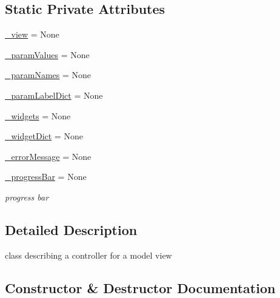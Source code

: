 \subsection*{Static Private Attributes}
\begin{DoxyCompactItemize}
\item 
\hyperlink{class_mu_mo_t_1_1_mu_mo_tcontroller_a27dd8543b5188cdfe40f622d267fe2c5}{\+\_\+view} = None
\item 
\hyperlink{class_mu_mo_t_1_1_mu_mo_tcontroller_a04608181fa27d9aad4983d3694f7ab17}{\+\_\+param\+Values} = None
\item 
\hyperlink{class_mu_mo_t_1_1_mu_mo_tcontroller_ac7734326ac8dbbf9bd0d2c9838633195}{\+\_\+param\+Names} = None
\item 
\hyperlink{class_mu_mo_t_1_1_mu_mo_tcontroller_a13bcda33e0e971cf4ad2710945226add}{\+\_\+param\+Label\+Dict} = None
\item 
\hyperlink{class_mu_mo_t_1_1_mu_mo_tcontroller_a397d0ee37a222317a1bab7deb1270a13}{\+\_\+widgets} = None
\item 
\hyperlink{class_mu_mo_t_1_1_mu_mo_tcontroller_a76e960ae74fc597cd22f7132507eaa20}{\+\_\+widget\+Dict} = None
\item 
\hyperlink{class_mu_mo_t_1_1_mu_mo_tcontroller_afb9cc1f1f0c08393b454f526842425cc}{\+\_\+error\+Message} = None
\item 
\hyperlink{class_mu_mo_t_1_1_mu_mo_tcontroller_a018864aa22d2adb0d3958fb0adbce8e2}{\+\_\+progress\+Bar} = None
\begin{DoxyCompactList}\small\item\em progress bar \end{DoxyCompactList}\end{DoxyCompactItemize}


\subsection{Detailed Description}
class describing a controller for a model view 

\subsection{Constructor \& Destructor Documentation}
\mbox{\label{class_mu_mo_t_1_1_mu_mo_tcontroller_a73251532d0348adaeafe8a178cfc6a73}} 
